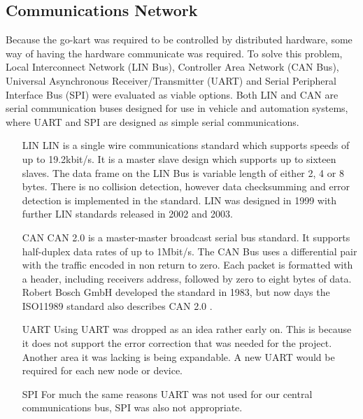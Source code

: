   \subsection{Communications Network}
  Because the go-kart was required to be controlled by distributed hardware,
  some way of having the hardware communicate was required. To solve this
  problem, Local Interconnect Network (LIN Bus), Controller Area Network (CAN
  Bus), Universal Asynchronous Receiver/Transmitter (UART) and Serial
  Peripheral Interface Bus (SPI) were evaluated as viable options. Both LIN and
  CAN are serial communication buses designed for use in vehicle and automation
  systems, where UART and SPI are designed as simple serial communications.
  
  \begin{itemize}
    \item[LIN]{LIN is a single wire communications standard which supports
    speeds of up to 19.2kbit/s\cite{LIN}. It is a master slave design which
    supports up to sixteen slaves. The data frame on the LIN Bus is variable
    length of either 2, 4 or 8 bytes. There is no collision detection, however
    data checksumming and error detection is implemented in the standard.  LIN
    was designed in 1999 with further LIN standards released in 2002 and 2003.}

    \item[CAN]{CAN 2.0 is a master-master broadcast serial bus standard. It
    supports half-duplex data rates of up to 1Mbit/s. The CAN Bus uses a
    differential pair with the traffic encoded in non return to zero. Each
    packet is formatted with a header, including receivers address, followed by
    zero to eight bytes of data. Robert Bosch GmbH \cite{bosch} developed the
    standard in 1983, but now days the ISO11989 standard also describes CAN 2.0
    \cite{boschCAN, ISOCAN}.}

    \item[UART]{Using UART was dropped as an idea rather early on. This is
    because it does not support the error correction that was needed for the
    project. Another area it was lacking is being expandable. A new UART would
    be required for each new node or device.}

    \item[SPI]{For much the same reasons UART was not used for our central
    communications bus, SPI was also not appropriate.} 

  \end{itemize}

